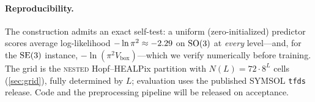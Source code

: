 \paragraph{Reproducibility.}
The construction admits an exact self-test: a uniform (zero-initialized) predictor
scores average log-likelihood $-\ln\pi^2\approx-2.29$ on $\mathrm{SO}(3)$ at \emph{every}
level---and, for the $\mathrm{SE}(3)$ instance, $-\ln(\pi^2 V_{\mathrm{box}})$---which we
verify numerically before training. The grid is the \textsc{nested} Hopf--HEALPix
partition with $N(L)=72\cdot 8^{L}$ cells (\cref{sec:grid}), fully determined by
$L$; evaluation uses the published SYMSOL \texttt{tfds} release. Code and the
preprocessing pipeline will be released on acceptance.
